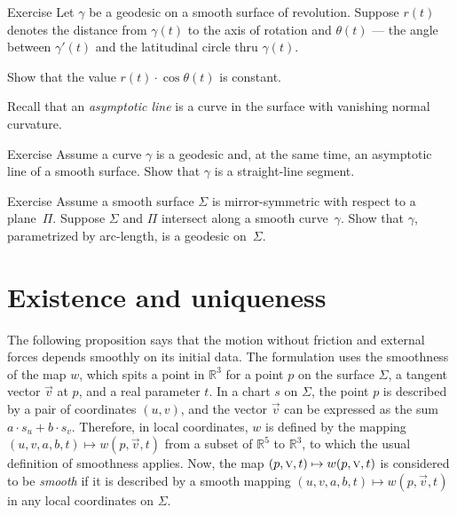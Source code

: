 \begin{thm}{Exercise}\label{ex:clairaut}
Let $\gamma$ be a geodesic on a smooth surface of revolution.
Suppose $r(t)$ denotes the distance from $\gamma(t)$ to the axis of rotation
and $\theta(t)$ --- the angle between $\gamma'(t)$ and the latitudinal circle thru $\gamma(t)$. 

Show that the value $r(t)\cdot \cos\theta(t)$ is constant. 
\end{thm}


Recall that an {}\emph{asymptotic line} is a curve in the surface with vanishing normal curvature.

\begin{thm}{Exercise}\label{ex:asymptotic-geodesic}
Assume a curve $\gamma$ is a geodesic and, at the same time, an asymptotic line of a smooth surface.
Show that $\gamma$ is a straight-line segment.
\end{thm}


\begin{thm}{Exercise}\label{ex:reflection-geodesic}
Assume a smooth surface $\Sigma$ is mirror-symmetric with respect to a plane~$\Pi$.
Suppose $\Sigma$ and $\Pi$ intersect along a smooth curve~$\gamma$.
Show that $\gamma$, parametrized by arc-length, is a geodesic on~$\Sigma$.
\end{thm}



\section{Existence and uniqueness}

The following proposition says that the motion without friction and external forces depends smoothly on its initial data. 
The formulation uses the smoothness of the map $w$, which spits a point in $\mathbb{R}^3$ for a point $p$ on the surface $\Sigma$, a tangent vector $\vec{v}$ at $p$, and a real parameter $t$.
In a chart $s$ on $\Sigma$, the point $p$ is described by a pair of coordinates $(u,v)$, and the vector $\vec{v}$ can be expressed as the sum $a\cdot s_u+b\cdot s_v$.
Therefore, in local coordinates, $w$ is defined by the mapping $(u,v,a,b,t)\mapsto w(p,\vec v,t)$ from a subset of $\mathbb{R}^5$ to $\mathbb{R}^3$, to which the usual definition of smoothness applies.
Now, the map $(p,\vec v, t)\z\mapsto w(p,\vec v, t)$ is considered to be \emph{smooth} if it is described by a smooth mapping $(u,v,a,b,t)\mapsto w(p,\vec v,t)$ in any local coordinates on $\Sigma$.


